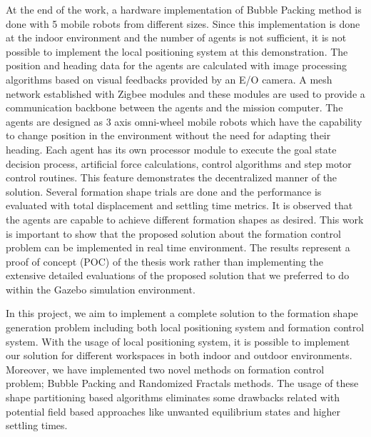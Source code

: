 At the end of the work, a hardware implementation of Bubble Packing method is done with 5 mobile robots from different sizes. Since this implementation is done at the  indoor environment and the number of agents is not sufficient, it is not possible to implement the local positioning system at this demonstration. The position and heading data for the agents are calculated with image processing algorithms based on visual feedbacks provided by an E/O camera. A mesh network established with Zigbee modules and these modules are used to provide a communication backbone between the agents and the mission computer. The agents are designed as 3 axis omni-wheel mobile robots which have the capability to change position in the environment without the need for adapting their heading. Each agent has its own processor module to execute the goal state decision process, artificial force calculations, control algorithms and step motor control routines. This feature demonstrates the decentralized manner of the solution. Several formation shape trials are done and the performance is evaluated with total displacement and settling time metrics. It is observed that the agents are capable to achieve different formation shapes as desired. This work is important to show that the proposed solution about the formation control problem can be implemented in real time environment. The results represent a proof of concept (POC) of the thesis work rather than implementing the extensive detailed evaluations of the proposed solution that we preferred to do within the Gazebo simulation environment.

In this project, we aim to implement a complete solution to the formation shape generation problem including both local positioning system and formation control system. With the usage of local positioning system, it is possible to implement our solution for different workspaces in both indoor and outdoor environments. Moreover, we have implemented two novel methods on formation control problem; Bubble Packing and Randomized Fractals methods. The usage of these shape partitioning based algorithms eliminates some drawbacks related with potential field based approaches like unwanted equilibrium states and higher settling times. 

